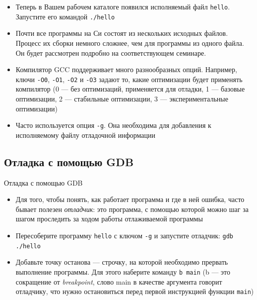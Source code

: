 \documentclass{beamer}
\begin{document}
\begin{frame}
	\begin{itemize}
		\item{Теперь в Вашем рабочем каталоге появился исполняемый файл \texttt{hello}. Запустите его командой \texttt{./hello}}\pause
		\item{Почти все программы на Си состоят из нескольких исходных файлов. Процесс их сборки немного сложнее, чем для программы из одного файла. Он будет рассмотрен подробно на соответствующем семинаре.}\pause
		\item{Компилятор GCC поддерживает много разнообразных опций. Например, ключи \texttt{-O0}, \texttt{-O1}, \texttt{-O2} и \texttt{-O3} задают то, какие оптимизации будет применять компилятор (0 --- без оптимизаций, применяется для отладки, 1 --- базовые оптимизации, 2 --- стабильные оптимизации, 3 --- экспериментальные оптимизации)}\pause
		\item{Часто используется опция \texttt{-g}. Она необходима для добавления к исполняемому файлу отладочной информации}
	\end{itemize}
\end{frame}

\subsection{Отладка с помощью GDB}
\begin{frame}{Отладка с помощью GDB}
	\begin{itemize}
		\item{Для того, чтобы понять, как работает программа и где в ней ошибка, часто бывает полезен \emph{отладчик}: это программа, с помощью которой можно шаг за шагом проследить за ходом работы отлаживаемой программы}\pause
		\item{Пересоберите программу \texttt{hello} с ключом \texttt{-g} и запустите отладчик: \texttt{gdb ./hello}}\pause
		\item{Добавьте точку останова --- строчку, на которой необходимо прервать выполнение программы. Для этого наберите команду \texttt{b main} (b --- это сокращение от \emph{breakpoint}, слово main в качестве аргумента говорит отладчику, что нужно остановиться перед первой инструкцией функции \texttt{main})}
	\end{itemize}
\end{frame}
\end{document}
